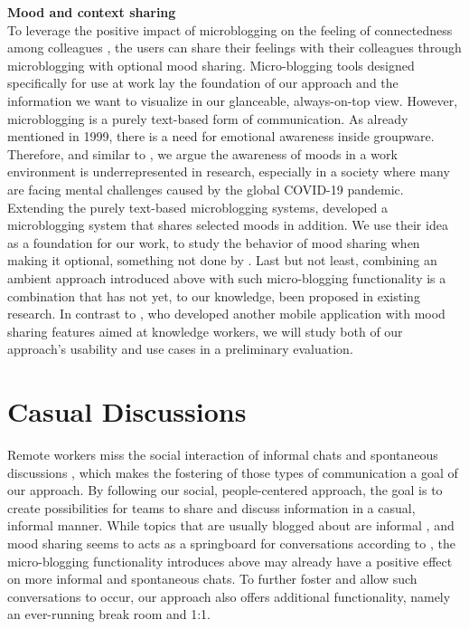 \medskip\noindent\textbf{Mood and context sharing}\\
To leverage the positive impact of microblogging on the feeling of connectedness among colleagues \autocite{dullemond2013fixing}, the users can share their feelings with their colleagues through microblogging with optional mood sharing. Micro-blogging tools designed specifically for use at work lay the foundation of our approach and the information we want to visualize in our glanceable, always-on-top view. However, microblogging is a purely text-based form of communication. As \textcite{garcia1999emotional} already mentioned in 1999, there is a need for emotional awareness inside groupware. Therefore, and similar to \autocite{mora2011supporting}, we argue the awareness of moods in a work environment is underrepresented in research, especially in a society where many are facing mental challenges caused by the global COVID-19 pandemic. Extending the purely text-based microblogging systems, \textcite{dullemond2013fixing} developed a microblogging system that shares selected moods in addition. We use their idea as a foundation for our work, to study the behavior of mood sharing when making it optional, something not done by \textcite{dullemond2013fixing}. Last but not least, combining an ambient approach introduced above with such micro-blogging functionality is a combination that has not yet, to our knowledge, been proposed in existing research. In contrast to \textcite{saari2008mobile}, who developed another mobile application with mood sharing features aimed at knowledge workers, we will study both of our approach's usability and use cases in a preliminary evaluation.

\section{Casual Discussions}
Remote workers miss the social interaction of informal chats and spontaneous discussions \autocite{cooper2002telecommuting}, which makes the fostering of those types of communication a goal of our approach. By following our social, people-centered approach, the goal is to create possibilities for teams to share and discuss information in a casual, informal manner. While topics that are usually blogged about are informal \autocite{ehrlich2010microblogging}, and mood sharing seems to acts as a springboard for conversations according to \textcite{church2010study}, the micro-blogging functionality introduces above may already have a positive effect on more informal and spontaneous chats. To further foster and allow such conversations to occur, our approach also offers additional functionality, namely an ever-running break room and 1:1.

